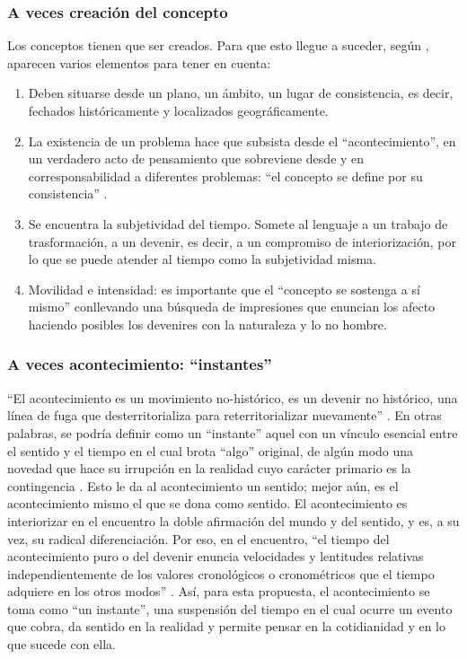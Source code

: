 \documentclass{textolivre}
\begin{document}
\subsubsection{A veces creación del concepto}\label{sec-creacion}
Los conceptos tienen que ser creados. Para que esto llegue a suceder, según \textcite{deleuze_que_1993}, aparecen varios elementos para tener en cuenta: 

\begin{enumerate}
    \item Deben situarse desde un plano, un ámbito, un lugar de consistencia, es decir, fechados históricamente y localizados geográficamente. 
    \item La existencia de un problema hace que subsista desde el “acontecimiento”, en un verdadero acto de pensamiento que sobreviene desde y en corresponsabilidad a diferentes problemas: “el concepto se define por su consistencia” \cite[p. 27]{deleuze_que_1993}. 
    \item Se encuentra la subjetividad del tiempo. Somete al lenguaje a un trabajo de trasformación, a un devenir, es decir, a un compromiso de interiorización, por lo que se puede atender al tiempo como la subjetividad misma. 
    \item Movilidad e intensidad: es importante que el “concepto se sostenga a sí mismo” \cite[p. 65]{deleuze_que_1993} conllevando una búsqueda de impresiones que enuncian los afecto haciendo posibles los devenires con la naturaleza y lo no hombre.
\end{enumerate}

\subsubsection{A veces acontecimiento: “instantes”}\label{sec-acontecimento}
“El acontecimiento es un movimiento no-histórico, es un devenir no histórico, una línea de fuga que desterritorializa para reterritorializar nuevamente” \cite[p. 97]{deleuze_que_1993}. En otras palabras, se podría definir como un “instante” aquel con un vínculo esencial entre el sentido y el tiempo en el cual brota “algo” original, de algún modo una novedad que hace su irrupción en la realidad cuyo carácter primario es la contingencia \cite{esperon_acontecimiento_2014}. Esto le da al acontecimiento un sentido; mejor aún, es el acontecimiento mismo el que se dona como sentido. El acontecimiento es interiorizar en el encuentro la doble afirmación del mundo y del sentido, y es, a su vez, su radical diferenciación. Por eso, en el encuentro, “el tiempo del acontecimiento puro o del devenir enuncia velocidades y lentitudes relativas independientemente de los valores cronológicos o cronométricos que el tiempo adquiere en los otros modos” \cite[p. 267]{deleuze_mil_1980}. Así, para esta propuesta, el acontecimiento se toma como “un instante”, una suspensión del tiempo en el cual ocurre un evento que cobra, da sentido en la realidad y permite pensar en la cotidianidad y en lo que sucede con ella.
\end{document}
